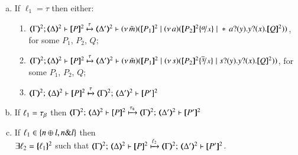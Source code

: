 \begin{proposition}
\begin{enumerate}[1.]
\begin{enumerate}[a)]
			\item	If
				$\ell_1 = \tau$ then either:

				\begin{enumerate}[-]
					\item	%
						$
						\horel{\tmap{\Gamma}{2}}{\tmap{\Delta}{2}}{\pmap{P}{2}}
						{\hby{\tau}}
						{\tmap{\Delta'}{2}}{}{\newsp{\tilde{m}}{\pmap{P_1}{2} \Par \newsp{a}
						{\pmap{P_2}{2}\subst{a}{x} \Par \repl{} \binp{a}{y} \binp{y}{x} \pmap{Q}{2}}}}
						$, for some $P_1$, $P_2$, $Q$;

					\item	%
						$
						\horel{\tmap{\Gamma}{2}}{\tmap{\Delta}{2}}{\pmap{P}{2}}
						{\hby{\tau}}
						{\tmap{\Delta'}{2}}{}{\newsp{\tilde{m}}{\pmap{P_1}{2} \Par \newsp{s}
						{\pmap{P_2}{2}\subst{\dual{s}}{x} \Par \binp{s}{y} \binp{y}{x} \pmap{Q}{2}}}}
						$, for some $P_1$, $P_2$, $Q$;

					\item	%
						$\tmap{\Gamma}{2};\, \tmap{\Delta}{2} \proves \pmap{P}{2}
						\hby{\tau}
						\tmap{\Gamma}{2};\, \tmap{\Delta'}{2} \proves \pmap{P'}{2}$


				\end{enumerate}
				
				\item	If $\ell_1 = \tau_{\beta}$ then
						$\tmap{\Gamma}{2};\, \tmap{\Delta}{2} \proves \pmap{P}{2}
						\hby{\stau}
						\tmap{\Gamma}{2};\, \tmap{\Delta'}{2} \proves \pmap{P'}{2}$

				   			   

			\item	 
				If  
				$\ell_1 \in \{n \oplus l, n \& l\}$
				 then \\
				$\exists \ell_2 = \{\!\!\{\ell_1\}\!\!\}^{2}$ such that 
				$\mapt{\Gamma}^{2};\, \mapt{\Delta}^{2} \proves  \map{P}^{2}
				\hby{\ell_2}
				\mapt{\Gamma}^{2};\, \mapt{\Delta'}^{2} \proves  \map{P'}^{2}$.			
		\end{enumerate}
		

\end{enumerate}
\end{proposition}

